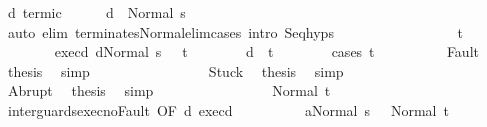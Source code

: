 \begin{isabellebody}
\ d{}\ termi{\isacharunderscore}c{}\isanewline
\ \ \ \ \isamarkupfalse%
\ {\isachardoublequoteopen}{\isasymGamma}{\isasymturnstile}d{}\ {\isasymdown}\ Normal\ s{\isacharprime}{\isachardoublequoteclose}\isanewline
\ \ \ \ \ \ \isamarkupfalse%
\ {\isacharparenleft}auto\ elim{\isacharcolon}\ terminates{\isacharunderscore}Normal{\isacharunderscore}elim{\isacharunderscore}cases\ intro{\isacharcolon}\ Seq{\isachardot}hyps{\isacharparenright}\isanewline
\ \ \ \ \isamarkupfalse%
\isanewline
\ \ \ \ \isacommand{{\isacharbraceleft}}\isamarkupfalse%
\isanewline
\ \ \ \ \ \ \isamarkupfalse%
\ t\isanewline
\ \ \ \ \ \ \isamarkupfalse%
\ exec{\isacharunderscore}d{}{\isacharcolon}\ {\isachardoublequoteopen}{\isasymGamma}{\isasymturnstile}{\isasymlangle}d{}{\isacharcomma}Normal\ s{\isacharprime}\ {\isasymrangle}\ {\isasymRightarrow}\ t{\isachardoublequoteclose}\isanewline
\ \ \ \ \ \ \isamarkupfalse%
\ {\isachardoublequoteopen}{\isasymGamma}{\isasymturnstile}d{}\ {\isasymdown}\ t{\isachardoublequoteclose}\isanewline
\ \ \ \ \ \ \isamarkupfalse%
\ {\isacharparenleft}cases\ t{\isacharparenright}\isanewline
\ \ \ \ \ \ \ \ \isamarkupfalse%
\ Fault\ \isamarkupfalse%
\ {\isacharquery}thesis\ \isamarkupfalse%
\ simp\isanewline
\ \ \ \ \ \ \isamarkupfalse%
\isanewline
\ \ \ \ \ \ \ \ \isamarkupfalse%
\ Stuck\ \isamarkupfalse%
\ {\isacharquery}thesis\ \isamarkupfalse%
\ simp\isanewline
\ \ \ \ \ \ \isamarkupfalse%
\isanewline
\ \ \ \ \ \ \ \ \isamarkupfalse%
\ Abrupt\ \isamarkupfalse%
\ {\isacharquery}thesis\ \isamarkupfalse%
\ simp\isanewline
\ \ \ \ \ \ \isamarkupfalse%
\isanewline
\ \ \ \ \ \ \ \ \isamarkupfalse%
\ {\isacharparenleft}Normal\ t{\isacharprime}{\isacharparenright}\isanewline
\ \ \ \ \ \ \ \ \isamarkupfalse%
\ inter{\isacharunderscore}guards{\isacharunderscore}exec{\isacharunderscore}noFault\ {\isacharbrackleft}OF\ d{}\ exec{\isacharunderscore}d{}{\isacharbrackright}\isanewline
\ \ \ \ \ \ \ \ \isamarkupfalse%
\ {\isachardoublequoteopen}{\isasymGamma}{\isasymturnstile}{\isasymlangle}a{}{\isacharcomma}Normal\ s{\isacharprime}\ {\isasymrangle}\ {\isasymRightarrow}\ Normal\ t{\isacharprime}{\isachardoublequoteclose}\isanewline

\end{isabellebody}
